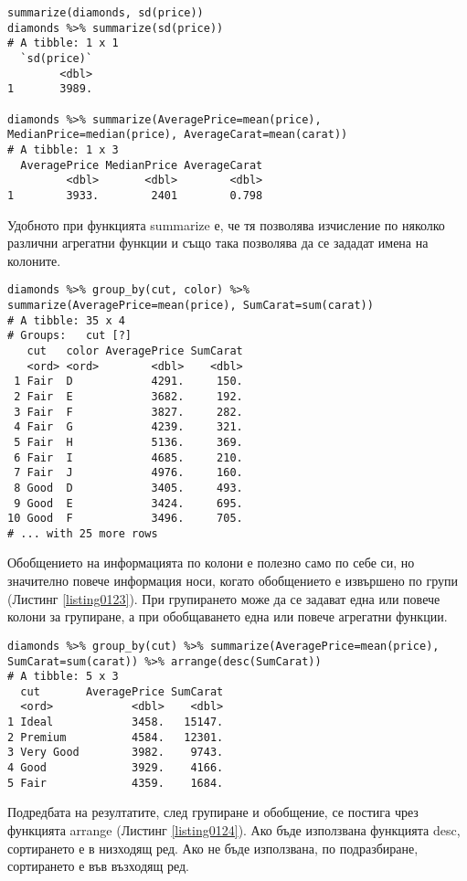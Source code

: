 \begin{lstlisting}[caption=Обобщаваща информация, label=listing0122]
summarize(diamonds, sd(price))
diamonds %>% summarize(sd(price))
# A tibble: 1 x 1
  `sd(price)`
        <dbl>
1       3989.

diamonds %>% summarize(AveragePrice=mean(price), MedianPrice=median(price), AverageCarat=mean(carat))
# A tibble: 1 x 3
  AveragePrice MedianPrice AverageCarat
         <dbl>       <dbl>        <dbl>
1        3933.        2401        0.798
\end{lstlisting}

Удобното при функцията summarize е, че тя позволява изчисление по няколко различни агрегатни функции и също така позволява да се зададат имена на колоните.

\begin{lstlisting}[caption=Групиране при обобщение, label=listing0123]
diamonds %>% group_by(cut, color) %>% summarize(AveragePrice=mean(price), SumCarat=sum(carat))
# A tibble: 35 x 4
# Groups:   cut [?]
   cut   color AveragePrice SumCarat
   <ord> <ord>        <dbl>    <dbl>
 1 Fair  D            4291.     150.
 2 Fair  E            3682.     192.
 3 Fair  F            3827.     282.
 4 Fair  G            4239.     321.
 5 Fair  H            5136.     369.
 6 Fair  I            4685.     210.
 7 Fair  J            4976.     160.
 8 Good  D            3405.     493.
 9 Good  E            3424.     695.
10 Good  F            3496.     705.
# ... with 25 more rows
\end{lstlisting}

Обобщението на информацията по колони е полезно само по себе си, но значително повече информация носи, когато обобщението е извършено по групи (Листинг \ref{listing0123}). При групирането може да се задават една или повече колони за групиране, а при обобщаването една или повече агрегатни функции.

\begin{lstlisting}[caption=Подредба на резултатите, label=listing0124]
diamonds %>% group_by(cut) %>% summarize(AveragePrice=mean(price), SumCarat=sum(carat)) %>% arrange(desc(SumCarat))
# A tibble: 5 x 3
  cut       AveragePrice SumCarat
  <ord>            <dbl>    <dbl>
1 Ideal            3458.   15147.
2 Premium          4584.   12301.
3 Very Good        3982.    9743.
4 Good             3929.    4166.
5 Fair             4359.    1684.
\end{lstlisting}

Подредбата на резултатите, след групиране и обобщение, се постига чрез функцията arrange (Листинг \ref{listing0124}). Ако бъде използвана функцията desc,  сортирането е в низходящ ред. Ако не бъде използвана, по подразбиране, сортирането е във възходящ ред.

